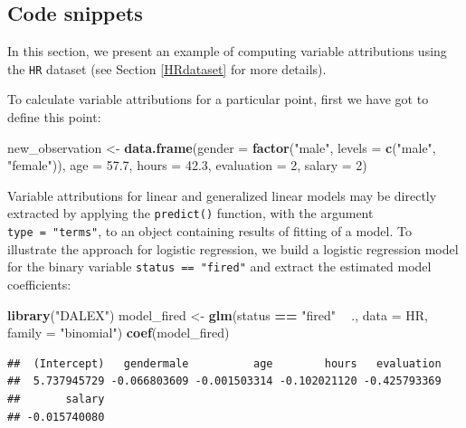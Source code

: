 \documentclass[]{krantz}
\newenvironment{Shaded}{\begin{snugshade}}{\end{snugshade}}
\newcommand{\DataTypeTok}[1]{\textcolor[rgb]{0.13,0.29,0.53}{#1}}
\newcommand{\DecValTok}[1]{\textcolor[rgb]{0.00,0.00,0.81}{#1}}
\newcommand{\FloatTok}[1]{\textcolor[rgb]{0.00,0.00,0.81}{#1}}
\newcommand{\KeywordTok}[1]{\textcolor[rgb]{0.13,0.29,0.53}{\textbf{#1}}}
\newcommand{\NormalTok}[1]{#1}
\newcommand{\OperatorTok}[1]{\textcolor[rgb]{0.81,0.36,0.00}{\textbf{#1}}}
\newcommand{\StringTok}[1]{\textcolor[rgb]{0.31,0.60,0.02}{#1}}
\theoremstyle{definition}
\theoremstyle{definition}
\theoremstyle{definition}
\theoremstyle{remark}
\begin{document}
\hypertarget{code-snippets-1}{%
\subsection{Code snippets}\label{code-snippets-1}}

In this section, we present an example of computing variable
attributions using the \texttt{HR} dataset (see Section \ref{HRdataset}
for more details).

To calculate variable attributions for a particular point, first we have
got to define this point:

\begin{Shaded}
\begin{Highlighting}[]
\NormalTok{new_observation <-}\StringTok{ }\KeywordTok{data.frame}\NormalTok{(}\DataTypeTok{gender =} \KeywordTok{factor}\NormalTok{(}\StringTok{"male"}\NormalTok{, }\DataTypeTok{levels =} \KeywordTok{c}\NormalTok{(}\StringTok{"male"}\NormalTok{, }\StringTok{"female"}\NormalTok{)),}
                      \DataTypeTok{age =} \FloatTok{57.7}\NormalTok{,}
                      \DataTypeTok{hours =} \FloatTok{42.3}\NormalTok{,}
                      \DataTypeTok{evaluation =} \DecValTok{2}\NormalTok{,}
                      \DataTypeTok{salary =} \DecValTok{2}\NormalTok{)}
\end{Highlighting}
\end{Shaded}

Variable attributions for linear and generalized linear models may be
directly extracted by applying the \texttt{predict()} function, with the
argument \texttt{type\ =\ "terms"}, to an object containing results of
fitting of a model. To illustrate the approach for logistic regression,
we build a logistic regression model for the binary variable
\texttt{status\ ==\ "fired"} and extract the estimated model
coefficients:

\begin{Shaded}
\begin{Highlighting}[]
\KeywordTok{library}\NormalTok{(}\StringTok{"DALEX"}\NormalTok{)}
\NormalTok{model_fired <-}\StringTok{ }\KeywordTok{glm}\NormalTok{(status }\OperatorTok{==}\StringTok{ "fired"} \OperatorTok{~}\StringTok{ }\NormalTok{., }\DataTypeTok{data =}\NormalTok{ HR, }\DataTypeTok{family =} \StringTok{"binomial"}\NormalTok{)}
\KeywordTok{coef}\NormalTok{(model_fired)}
\end{Highlighting}
\end{Shaded}

\begin{verbatim}
##  (Intercept)   gendermale          age        hours   evaluation 
##  5.737945729 -0.066803609 -0.001503314 -0.102021120 -0.425793369 
##       salary 
## -0.015740080
\end{verbatim}
\end{document}
